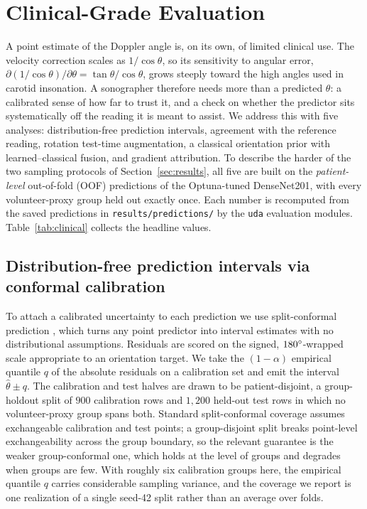 \section{Clinical-Grade Evaluation}
\label{sec:evaluation}

A point estimate of the Doppler angle is, on its own, of limited clinical use. The velocity correction scales as $1/\cos\theta$, so its sensitivity to angular error, $\partial(1/\cos\theta)/\partial\theta = \tan\theta/\cos\theta$, grows steeply toward the high angles used in carotid insonation. A sonographer therefore needs more than a predicted $\theta$: a calibrated sense of how far to trust it, and a check on whether the predictor sits systematically off the reading it is meant to assist. We address this with five analyses: distribution-free prediction intervals, agreement with the reference reading, rotation test-time augmentation, a classical orientation prior with learned--classical fusion, and gradient attribution. To describe the harder of the two sampling protocols of Section~\ref{sec:results}, all five are built on the \emph{patient-level} out-of-fold (OOF) predictions of the Optuna-tuned DenseNet201, with every volunteer-proxy group held out exactly once. Each number is recomputed from the saved predictions in \texttt{results/predictions/} by the \texttt{uda} evaluation modules. Table~\ref{tab:clinical} collects the headline values.



\subsection{Distribution-free prediction intervals via conformal calibration}
\label{sec:conformal}

To attach a calibrated uncertainty to each prediction we use split-conformal prediction \citep{Vovk2005,Lei2018}, which turns any point predictor into interval estimates with no distributional assumptions. Residuals are scored on the signed, $180^\circ$-wrapped scale appropriate to an orientation target. We take the $(1-\alpha)$ empirical quantile $q$ of the absolute residuals on a calibration set and emit the interval $\hat{\theta}\pm q$. The calibration and test halves are drawn to be patient-disjoint, a group-holdout split of $900$ calibration rows and $1{,}200$ held-out test rows in which no volunteer-proxy group spans both. Standard split-conformal coverage assumes exchangeable calibration and test points; a group-disjoint split breaks point-level exchangeability across the group boundary, so the relevant guarantee is the weaker group-conformal one, which holds at the level of groups and degrades when groups are few. With roughly six calibration groups here, the empirical quantile $q$ carries considerable sampling variance, and the coverage we report is one realization of a single seed-42 split rather than an average over folds.

